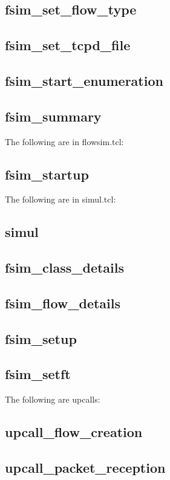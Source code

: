 \documentclass{article}
\begin{document}
\subsection{fsim\_set\_flow\_type}

\subsection{fsim\_set\_tcpd\_file}

\subsection{fsim\_start\_enumeration}

\subsection{fsim\_summary}

The following are in flowsim.tcl:
\subsection{fsim\_startup}

The following are in simul.tcl:
\subsection{simul}

\subsection{fsim\_class\_details}

\subsection{fsim\_flow\_details}

\subsection{fsim\_setup}

\subsection{fsim\_setft}

The following are upcalls:
\subsection{upcall\_flow\_creation}

\subsection{upcall\_packet\_reception}
\end{document}
